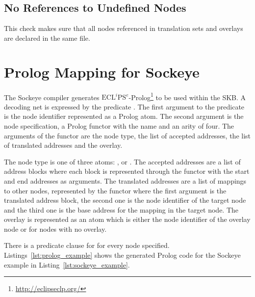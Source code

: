 \documentclass[a4paper,11pt,twoside]{report}
\begin{document}
{{{\section{No References to Undefined Nodes}
This check makes sure that all nodes referenced in translation sets and overlays are declared in the same file.


\chapter{Prolog Mapping for Sockeye}
\label{chap:prolog}
The Sockeye compiler generates \(\text{ECL}^i\text{PS}^e\)-Prolog\footnote{\href{http://eclipseclp.org/}{http://eclipseclp.org/}} to be used within the SKB.
A decoding net is expressed by the predicate . The first argument to the predicate is the node identifier represented as a Prolog atom.
The second argument is the node specification, a Prolog functor with the name  and an arity of four. The arguments of the functor are the node type, the list of accepted addresses, the list of translated addresses and the overlay.

The node type is one of three atoms: ,  or .
The accepted addresses are a list of address blocks where each block is represented through the functor  with the start and end addresses as arguments.
The translated addresses are a list of mappings to other nodes, represented by the functor  where the first argument is the translated address block, the second one is the node identifier of the target node and the third one is the base address for the mapping in the target node.
The overlay is represented as an atom which is either the node identifier of the overlay node or  for nodes with no overlay.

There is a predicate clause for  for every node specified. 
Listings~\ref{lst:prolog_example} shows the generated Prolog code for the Sockeye example in Listing~\ref{lst:sockeye_example}.




}}}
\end{document}

